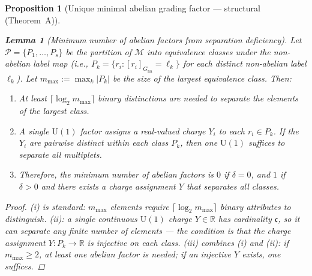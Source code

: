 \documentclass[11pt]{article}
\newtheorem{lemma}[theorem]{Lemma}
\newtheorem{proposition}[theorem]{Proposition}
\theoremstyle{definition}
\newcommand{\U}{\mathrm{U}}
\begin{document}
\begin{proposition}[Unique minimal abelian grading factor ---
structural (Theorem~A)]
\begin{lemma}[Minimum number of abelian factors from separation deficiency]
\label{lem:min_abelian}
Let $\mathcal{P} = \{P_1, \ldots, P_s\}$ be the partition of
$\mathcal{M}$ into equivalence classes under the non-abelian label
map (i.e., $P_k = \{r_i : [r_i]_{G_{\mathrm{na}}} = \ell_k\}$
for each distinct non-abelian label $\ell_k$).  Let
$m_{\max} := \max_k |P_k|$ be the size of the largest equivalence
class.  Then:
\begin{enumerate}[label=(\roman*),nosep]
  \item At least $\lceil \log_2 m_{\max} \rceil$ binary distinctions
  are needed to separate the elements of the largest class.
  \item A single $\U(1)$ factor assigns a real-valued charge $Y_i$ to
  each $r_i \in P_k$.  If the $Y_i$ are pairwise distinct within
  each class $P_k$, then one $\U(1)$ suffices to separate all
  multiplets.
  \item Therefore, the minimum number of abelian factors is $0$ if
  $\delta = 0$, and $1$ if $\delta > 0$ and there exists a charge
  assignment $Y$ that separates all classes.
\end{enumerate}
\end{lemma}

\begin{proof}
(i) is standard: $m_{\max}$ elements require $\lceil \log_2 m_{\max}
\rceil$ binary attributes to distinguish.  (ii): a single continuous
$\U(1)$ charge $Y \in \mathbb{R}$ has cardinality $\mathfrak{c}$, so
it can separate any finite number of elements --- the condition is that
the charge assignment $Y: P_k \to \mathbb{R}$ is injective on each
class.  (iii) combines (i) and (ii): if $m_{\max} \ge 2$, at least
one abelian factor is needed; if an injective $Y$ exists, one
suffices.
\end{proof}


\end{proposition}
\end{document}
